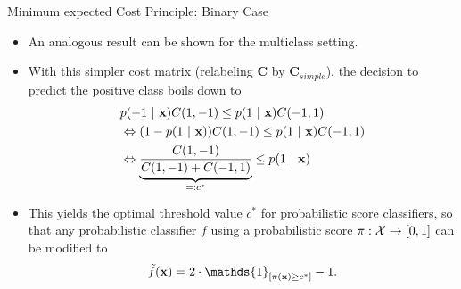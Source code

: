 \documentclass[11pt,compress,t,notes=noshow, xcolor=table]{beamer}
\begin{document}
\begin{vbframe}{Minimum expected Cost Principle: Binary Case}
{\begin{itemize}
		\lz
		\item An analogous result can be shown for the multiclass setting.
		
		
		\item With this simpler cost matrix (relabeling $\mathbf{C}$ by $\mathbf{C}_{simple}$), the decision to predict the positive class boils down to 
%		
		\begin{align*}
%			 	
			& p(-1 ~|~ \xv ) C(1,-1)   \leq  	p(1 ~|~ \xv ) C(-1,1)  \\
%			
			&\Leftrightarrow (1- p(1 ~|~ \xv ) ) C(1,-1)   \leq  	p(1 ~|~ \xv ) C(-1,1) \\
%			
			&\Leftrightarrow \underbrace{\frac{C(1,-1)}{C(1,-1) + C(-1,1) } }_{=:c^*}  \leq  	p(1 ~|~ \xv ) \\
		\end{align*}
%	
		\item This yields the optimal threshold value $c^*$ for probabilistic score classifiers, so that any probabilistic classifier $f$ using a probabilistic score $\pi:\mathcal{X} \to [0,1]$ can be modified to
%		
		$$   \tilde f(\xv) = 2 \cdot \mathds{1}_{[ \pi(\xv) \geq c^*]} -1. $$
							
		\end{itemize}
	}
\end{vbframe}

	
\end{document}
